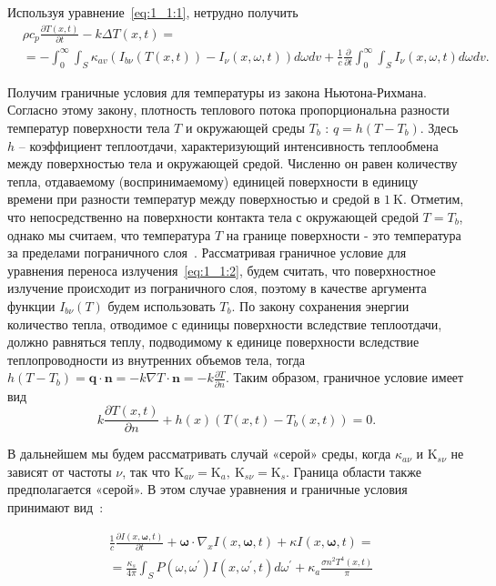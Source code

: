 Используя уравнение~\eqref{eq:1_1:1}, нетрудно получить
\[
    \begin{aligned}
        &\rho c_{p} \frac{\partial T(x, t)}{\partial t}
        -k \Delta T(x, t) = \\
        &=-\int_{0}^{\infty} \int_{S} \kappa_{a v}
        \left(I_{b \nu}(T(x, t))-I_{\nu}(x, \omega, t)\right) d \omega d v
        +\frac{1}{c} \frac{\partial}{\partial t}
        \int_{0}^{\infty} \int_{S} I_{\nu}(x, \omega, t) d \omega d v.
    \end{aligned}
\]

Получим граничные условия для температуры из закона Ньютона-Рихмана.
Согласно этому закону, плотность теплового потока пропорциональна разности температур
поверхности тела $T$ и окружающей среды $T_{b}$ : $q=h\left(T-T_{b}\right)$.
Здесь $h$ -- коэффициент теплоотдачи, характеризующий интенсивность
теплообмена между поверхностью тела и окружающей средой.
Численно он равен количеству тепла, отдаваемому (воспринимаемому) единицей поверхности в единицу времени
при разности температур между поверхностью и средой в $1 \mathrm{~K}$.
Отметим, что непосредственно
на поверхности контакта тела с окружающей средой $T=T_{b}$,
однако мы считаем, что температура $T$ на
границе поверхности - это температура за пределами пограничного слоя~\cite{Mazo}.
Рассматривая граничное условие для уравнения переноса излучения~\eqref{eq:1_1:2},
будем считать, что поверхностное излучение происходит из пограничного слоя,
поэтому в качестве аргумента функции $I_{b \nu}(T)$ будем использовать $T_{b}$.
По закону сохранения энергии количество тепла, отводимое с единицы поверхности
вследствие теплоотдачи, должно равняться теплу, подводимому к единице поверхности
вследствие теплопроводности из внутренних объемов тела, тогда
$h\left(T-T_{b}\right)=\mathbf{q} \cdot \mathbf{n} =
-k \nabla T \cdot \mathbf{n}=-k \frac{\partial T}{\partial n}$.
Таким образом, граничное условие имеет вид
\[
    k \frac{\partial T(x, t)}{\partial n}+h(x)\left(T(x, t)-T_{b}(x, t)\right)=0.
\]

В дальнейшем мы будем рассматривать случай «серой» среды,
когда $\kappa_{a \nu}$ и $\mathrm{K}_{s \nu}$ не зависят от частоты $\nu$,
так что $\mathrm{K}_{a \nu}=\mathrm{K}_{a}, \mathrm{~K}_{s \nu}=\mathrm{K}_{s}$.
Граница области также предполагается «серой».
В этом случае уравнения и граничные условия принимают вид~\cite{Kovtanyuk2014a}:

\begin{equation}
    \label{eq:1_1:3}
    \begin{aligned}
        & \frac{1}{c} \frac{\partial I(x, \boldsymbol{\omega}, t)}{\partial t}
        +\boldsymbol{\omega} \cdot \nabla_{x} I(x, \boldsymbol{\omega}, t)
        +\kappa I(x, \boldsymbol{\omega}, t)= \\
        & =\frac{\kappa_{s}}{4 \pi} \int_{S} P
        \left(\omega, \omega^{\prime}\right) I
        \left(x, \omega^{\prime}, t\right) d \omega^{\prime}
        +\kappa_{a} \frac{\sigma n^{2} T^{4}(x, t)}{\pi}
    \end{aligned}
\end{equation}


